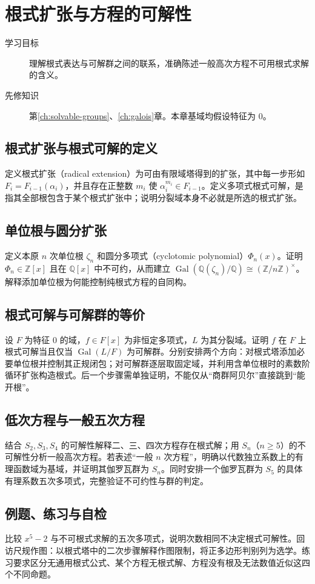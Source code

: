\setcounter{chapter}{18} %
\chapter{根式扩张与方程的可解性}\label{ch:radicals}

\begin{description}
  \item[学习目标] 理解根式表达与可解群之间的联系，准确陈述一般高次方程不可用根式求解的含义。
  \item[先修知识] 第\ref{ch:solvable-groups}、\ref{ch:galois}章。本章基域均假设特征为 $0$。
\end{description}

\section{根式扩张与根式可解的定义}
定义根式扩张（radical extension）为可由有限域塔得到的扩张，其中每一步形如 $F_i=F_{i-1}(\alpha_i)$，并且存在正整数 $m_i$ 使 $\alpha_i^{m_i}\in F_{i-1}$。定义多项式根式可解，是指其全部根包含于某个根式扩张中；说明分裂域本身不必就是所选的根式扩张。

\section{单位根与圆分扩张}
定义本原 $n$ 次单位根 $\zeta_n$ 和圆分多项式（cyclotomic polynomial）$\Phi_n(x)$。证明 $\Phi_n\in\mathbb Z[x]$ 且在 $\mathbb Q[x]$ 中不可约，从而建立 $\operatorname{Gal}(\mathbb Q(\zeta_n)/\mathbb Q)\cong(\mathbb Z/n\mathbb Z)^\times$。解释添加单位根为何能控制纯根式方程的自同构。

\section{根式可解与可解群的等价}
设 $F$ 为特征 $0$ 的域，$f\in F[x]$ 为非恒定多项式，$L$ 为其分裂域。证明 $f$ 在 $F$ 上根式可解当且仅当 $\operatorname{Gal}(L/F)$ 为可解群。分别安排两个方向：对根式塔添加必要单位根并控制其正规闭包；对可解群逐层取固定域，并利用含单位根时的素数阶循环扩张构造根式。后一个步骤需单独证明，不能仅从“商群阿贝尔”直接跳到“能开根”。

\section{低次方程与一般五次方程}
结合 $S_2,S_3,S_4$ 的可解性解释二、三、四次方程存在根式解；用 $S_n$（$n\geq5$）的不可解性分析一般高次方程。若表述“一般 $n$ 次方程”，明确以代数独立系数上的有理函数域为基域，并证明其伽罗瓦群为 $S_n$。同时安排一个伽罗瓦群为 $S_5$ 的具体有理系数五次多项式，完整验证不可约性与群的判定。

\section{例题、练习与自检}
比较 $x^5-2$ 与不可根式求解的五次多项式，说明次数相同不决定根式可解性。回访尺规作图：以根式塔中的二次步骤解释作图限制，将正多边形判别列为选学。练习要求区分无通用根式公式、某个方程无根式解、方程没有根及无法数值近似这四个不同命题。

